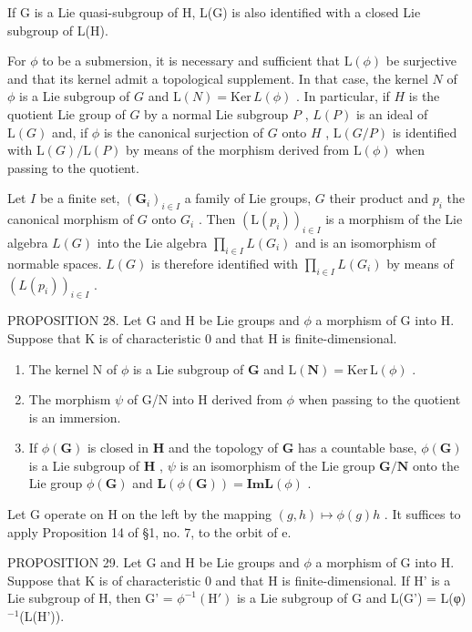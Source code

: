 If G is a Lie quasi-subgroup of H, L(G) is also identified with a closed Lie subgroup of L(H).

For \(\phi\) to be a submersion, it is necessary and sufficient that \(\mathrm{L}(\phi)\) be surjective and that its kernel admit a topological supplement. In that case, the kernel \(N\) of \(\phi\) is a Lie subgroup of \(G\) and \(\mathrm{L}(N) = \mathrm{Ker} \, L(\phi)\) . In particular, if \(H\) is the quotient Lie group of \(G\) by a normal Lie subgroup \(P\) , \(L(P)\) is an ideal of \(\mathrm{L}(G)\) and, if \(\phi\) is the canonical surjection of \(G\) onto \(H\) , \(\mathrm{L}(G/P)\) is identified with \(\mathrm{L}(G)/\mathrm{L}(P)\) by means of the morphism derived from \(\mathrm{L}(\phi)\) when passing to the quotient.

Let \(I\) be a finite set, \((\mathbf{G}_{i})_{i\in I}\) a family of Lie groups, \(G\) their product and \(p_i\) the canonical morphism of \(G\) onto \(G_i\) . Then \((\mathrm{L}(p_i))_{i\in I}\) is a morphism of the Lie algebra \(L(G)\) into the Lie algebra \(\prod_{i\in I} L(G_i)\) and is an isomorphism of normable spaces. \(L(G)\) is therefore identified with \(\prod_{i\in I} L(G_i)\) by means of \((L(p_i))_{i\in I}\) .

PROPOSITION 28. Let G and H be Lie groups and \(\phi\) a morphism of G into H. Suppose that K is of characteristic 0 and that H is finite-dimensional.

\begin{enumerate}
\def\labelenumi{(\roman{enumi})}
\item
  The kernel N of \(\phi\) is a Lie subgroup of \(\mathbf{G}\) and \(\mathrm{L}(\mathbf{N}) = \mathrm{Ker} \, \mathrm{L}(\phi)\) .
\item
  The morphism \(\psi\) of G/N into H derived from \(\phi\) when passing to the quotient is an immersion.
\item
  If \(\phi(\mathbf{G})\) is closed in \(\mathbf{H}\) and the topology of \(\mathbf{G}\) has a countable base, \(\phi(\mathbf{G})\) is a Lie subgroup of \(\mathbf{H}\) , \(\psi\) is an isomorphism of the Lie group \(\mathbf{G}/\mathbf{N}\) onto the Lie group \(\phi(\mathbf{G})\) and \(\mathbf{L}(\phi(\mathbf{G})) = \mathbf{Im} \mathbf{L}(\phi)\) .
\end{enumerate}

Let G operate on H on the left by the mapping \((g, h) \mapsto \phi(g)h\) . It suffices to apply Proposition 14 of §1, no. 7, to the orbit of e.

PROPOSITION 29. Let G and H be Lie groups and \(\phi\) a morphism of G into H. Suppose that K is of characteristic 0 and that H is finite-dimensional. If H' is a Lie subgroup of H, then G' = \(\phi^{-1}(\mathrm{H}')\) is a Lie subgroup of G and L(G') = L(φ)\(^{-1}\)(L(H')).

